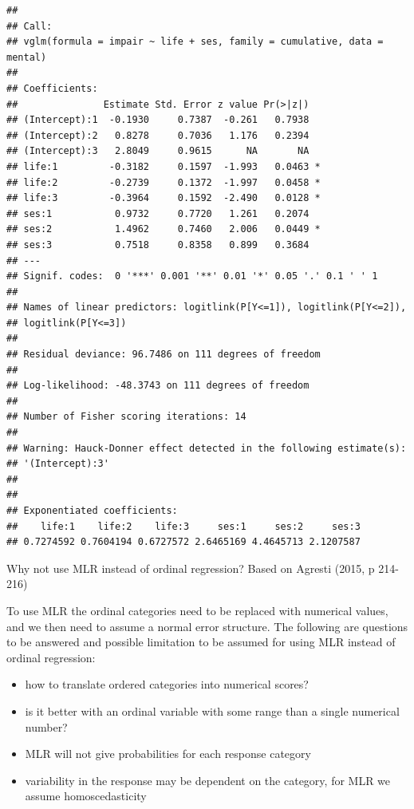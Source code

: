 \documentclass[
  ignorenonframetext,
]{beamer}
\providecommand{\tightlist}{%
  \setlength{\itemsep}{0pt}\setlength{\parskip}{0pt}}
\begin{document}
\begin{frame}[fragile]
\begin{verbatim}
## 
## Call:
## vglm(formula = impair ~ life + ses, family = cumulative, data = mental)
## 
## Coefficients: 
##               Estimate Std. Error z value Pr(>|z|)  
## (Intercept):1  -0.1930     0.7387  -0.261   0.7938  
## (Intercept):2   0.8278     0.7036   1.176   0.2394  
## (Intercept):3   2.8049     0.9615      NA       NA  
## life:1         -0.3182     0.1597  -1.993   0.0463 *
## life:2         -0.2739     0.1372  -1.997   0.0458 *
## life:3         -0.3964     0.1592  -2.490   0.0128 *
## ses:1           0.9732     0.7720   1.261   0.2074  
## ses:2           1.4962     0.7460   2.006   0.0449 *
## ses:3           0.7518     0.8358   0.899   0.3684  
## ---
## Signif. codes:  0 '***' 0.001 '**' 0.01 '*' 0.05 '.' 0.1 ' ' 1
## 
## Names of linear predictors: logitlink(P[Y<=1]), logitlink(P[Y<=2]), 
## logitlink(P[Y<=3])
## 
## Residual deviance: 96.7486 on 111 degrees of freedom
## 
## Log-likelihood: -48.3743 on 111 degrees of freedom
## 
## Number of Fisher scoring iterations: 14 
## 
## Warning: Hauck-Donner effect detected in the following estimate(s):
## '(Intercept):3'
## 
## 
## Exponentiated coefficients:
##    life:1    life:2    life:3     ses:1     ses:2     ses:3 
## 0.7274592 0.7604194 0.6727572 2.6465169 4.4645713 2.1207587
\end{verbatim}
\end{frame}

\begin{frame}
\begin{block}{Why not use MLR instead of ordinal regression?}
\protect\hypertarget{why-not-use-mlr-instead-of-ordinal-regression}{}
Based on Agresti (2015, p 214-216)

To use MLR the ordinal categories need to be replaced with numerical
values, and we then need to assume a normal error structure. The
following are questions to be answered and possible limitation to be
assumed for using MLR instead of ordinal regression:

\begin{itemize}
\tightlist
\item
  how to translate ordered categories into numerical scores?
\item
  is it better with an ordinal variable with some range than a single
  numerical number?
\item
  MLR will not give probabilities for each response category
\item
  variability in the response may be dependent on the category, for MLR
  we assume homoscedasticity
\end{itemize}
\end{block}
\end{frame}
\end{document}
